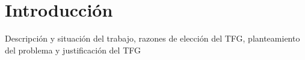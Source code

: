 \chapter{Introducci\'{o}n}
\newpage
Descripción y situación del trabajo, razones de elección del TFG, 
planteamiento del problema y justificación del TFG 
